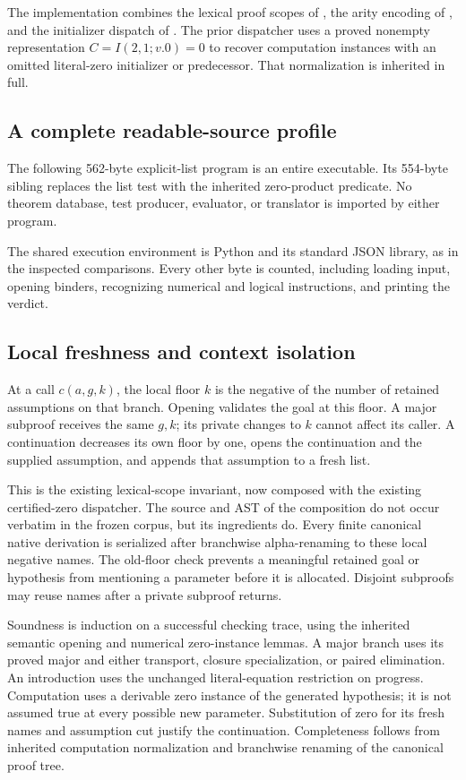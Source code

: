 \documentclass[11pt,letterpaper]{article}
\theoremstyle{definition}\newtheorem{definition}[theorem]{Definition}
\theoremstyle{remark}\newtheorem{remark}[theorem]{Remark}
\begin{document}
The implementation combines the lexical proof scopes of
\cite{scopes}, the arity encoding of \cite{arity}, and the initializer
dispatch of \cite{certified}. The prior dispatcher uses a proved
nonempty representation $C=I(2,1;v.0)=0$ to recover computation instances
with an omitted literal-zero initializer or predecessor. That
normalization is inherited in full.

\subsection{A complete readable-source profile}
The following 562-byte explicit-list program is an entire executable.
Its 554-byte sibling replaces the list test with the inherited
zero-product predicate. No theorem database, test producer, evaluator,
or translator is imported by either program.

The shared execution environment is Python and its standard JSON
library, as in the inspected comparisons. Every other byte is counted,
including loading input, opening binders, recognizing numerical and
logical instructions, and printing the verdict.

\subsection{Local freshness and context isolation}
At a call $c(a,g,k)$, the local floor $k$ is the negative of the number
of retained assumptions on that branch. Opening validates the goal
at this floor. A major subproof receives the same $g,k$; its private
changes to $k$ cannot affect its caller. A continuation decreases its
own floor by one, opens the continuation and the supplied assumption,
and appends that assumption to a fresh list.

This is the existing lexical-scope invariant, now composed with the
existing certified-zero dispatcher. The source and AST of the
composition do not occur verbatim in the frozen corpus, but its
ingredients do. Every finite canonical native derivation is serialized
after branchwise alpha-renaming to these local negative names.
The old-floor check prevents a meaningful retained goal or hypothesis
from mentioning a parameter before it is allocated. Disjoint subproofs
may reuse names after a private subproof returns.

Soundness is induction on a successful checking trace, using the
inherited semantic opening and numerical zero-instance lemmas. A major
branch uses its proved major and either transport, closure specialization,
or paired elimination. An introduction uses the unchanged literal-equation
restriction on progress. Computation uses a derivable zero instance of
the generated hypothesis; it is not assumed true at every possible new
parameter. Substitution of zero for its fresh names and assumption cut
justify the continuation. Completeness follows from inherited computation
normalization and branchwise renaming of the canonical proof tree.
\end{document}
